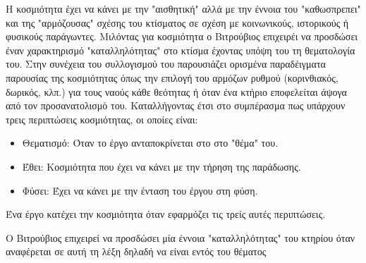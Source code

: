 Η κοσμιότητα έχει να κάνει με την "αισθητική" αλλά με την έννοια του "καθωσπρεπει" και της "αρμόζουσας" σχέσης του κτίσματος σε σχέση με κοινωνικούς, ιστορικούς ή φυσικούς παράγωντες. Μιλόντας για κοσμιότητα ο Βιτρούβιος επιχειρέι να προσδώσει έναν χαρακτηρισμό "καταλληλότητας" στο κτίσμα έχοντας υπόψη του τη θεματολογία του. Στην συνέχεια του συλλογισμού του παρουσιάζει ορισμένα παραδέιγματα παρουσίας της κοσμιότητας όπως την επιλογή του αρμόζων ρυθμού (κορινθιακός, δωρικός, κλπ.) για τους ναούς κάθε θεότητας ή όταν ένα κτήριο εποφελείται άψογα από τον προσανατολισμό του. \cite[σ.~498-499]{scranton_vitruvius_1974}Καταλλήγοντας έτσι στο συμπέρασμα πως υπάρχουν τρεις περιπτώσεις κοσμιότητας, οι οποίες είναι:

\begin{itemize}
  \item Θεματισμό: Όταν το έργο ανταποκρίνεται στο στο "θέμα" του.
  \item Έθει: Κοσμιότητα που έχει να κάνει με την τήρηση της παράδωσης.
  \item Φύσει: Έχει να κάνει με την ένταση του έργου στη φύση.
\end{itemize}
Ένα έργο κατέχει την κοσμιότητα όταν εφαρμόζει τις τρείς αυτές περιπτώσεις. \cite[σ.~51-53,97]{vitruvius-lefas}

Ο Βιτρούβιος επιχειρεί να προσδώσει μία έννοια "καταλληλότητας" του κτηρίου όταν αναφέρεται σε αυτή τη λέξη δηλαδή να είναι εντός του θέματος
  
  
  
  


  
  



  
